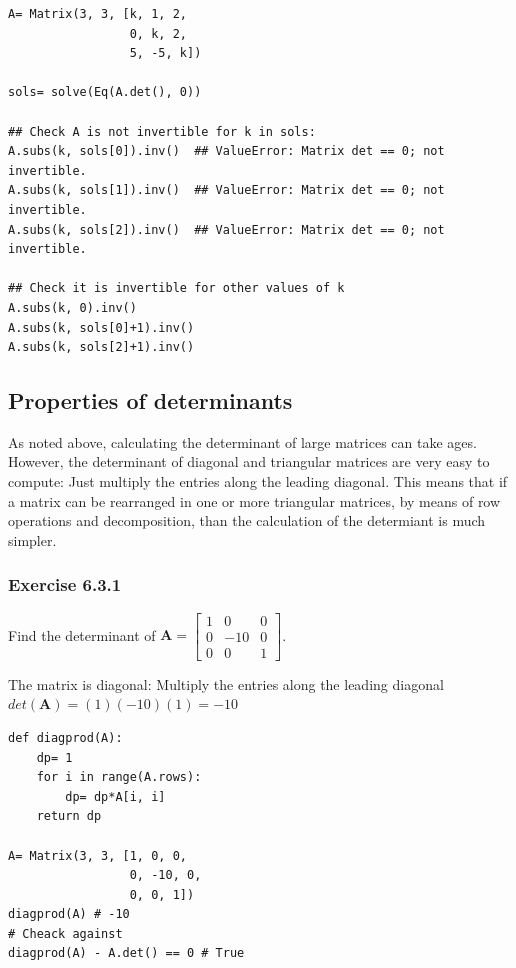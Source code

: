 \begin{verbatim}
A= Matrix(3, 3, [k, 1, 2,
                 0, k, 2,
                 5, -5, k])

sols= solve(Eq(A.det(), 0))

## Check A is not invertible for k in sols:
A.subs(k, sols[0]).inv()  ## ValueError: Matrix det == 0; not invertible.
A.subs(k, sols[1]).inv()  ## ValueError: Matrix det == 0; not invertible.
A.subs(k, sols[2]).inv()  ## ValueError: Matrix det == 0; not invertible.

## Check it is invertible for other values of k
A.subs(k, 0).inv()
A.subs(k, sols[0]+1).inv()
A.subs(k, sols[2]+1).inv()
\end{verbatim}


\subsection{Properties of determinants}

As noted above, calculating the determinant of large matrices can take ages. However,
the determinant of diagonal and triangular matrices are very easy to compute:
Just multiply the entries along the leading diagonal. This means that if a matrix can be
rearranged in one or more triangular matrices, by means of row operations and decomposition,
than the calculation of the determiant is much simpler.

\subsubsection{Exercise 6.3.1}

Find the determinant of $\mathbf{A}= \left[\begin{matrix}1 & 0 & 0\\0 & -10 & 0\\0 & 0 & 1\end{matrix}\right]$.

The matrix is diagonal: Multiply the entries along the leading diagonal
$det(\mathbf{A}) = (1) (-10) (1)= -10$

\begin{verbatim}
def diagprod(A):
    dp= 1
    for i in range(A.rows):
        dp= dp*A[i, i]
    return dp
    
A= Matrix(3, 3, [1, 0, 0,
                 0, -10, 0,
                 0, 0, 1])
diagprod(A) # -10
# Cheack against
diagprod(A) - A.det() == 0 # True
\end{verbatim}

